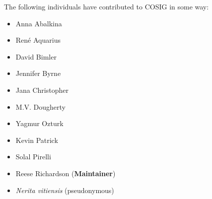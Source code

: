 \documentclass[letterpaper, 12pt]{article}
\begin{document}
\pagebreak

The following individuals have contributed to COSIG in some way:

\begin{itemize}
    \setlength\itemsep{-0.5em}
    \item Anna Abalkina 
    \item Ren\'e Aquarius 
    \item David Bimler 
    \item Jennifer Byrne 
    \item Jana Christopher 
    \item M.V. Dougherty 
    \item Yagmur Ozturk 
    \item Kevin Patrick 
    \item Solal Pirelli 
    \item Reese Richardson  (\textbf{Maintainer})
    \item \textit{Nerita vitiensis} (pseudonymous)
\end{itemize}
\end{document}
